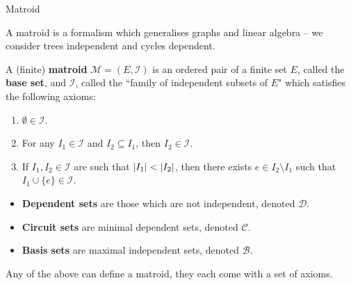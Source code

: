 \documentclass[9pt]{beamer}
\def\calM{\mathcal M}
\def\calC{\mathcal C}
\def\calI{\mathcal I}
\def\calD{\mathcal D}
\def\calB{\mathcal B}
\DeclarePairedDelimiter\abs{\lvert}{\rvert}
\begin{document}
    \begin{frame}{Matroid}

        A matroid is a formalism which generalises graphs and linear algebra -- we consider trees independent and cycles dependent.
        
        \pause

        \vspace{12pt}

        A (finite) \textbf{matroid} $\calM=(E, \calI)$ is an ordered pair of a finite set $E$, called the \textbf{base set}, and $\calI$, called the ``family of independent subsets of $E$" which satisfies the following axioms:
        
        \begin{enumerate}
    
            \item $\emptyset\in\calI$.
            \item  For any $I_1\in\calI$ and $I_2\subseteq I_1$, then $I_2\in\calI$.
            \item If $I_1, I_2\in\calI$ are such that $\abs*{I_1}<\abs*{I_2}$, then there exists $e\in I_2\setminus I_1$ such that $I_1\cup\{e\}\in\calI$.
            
        \end{enumerate}

        \pause

        \vspace{12pt}
    
        \begin{itemize}
            \item \textbf{Dependent sets} are those which are not independent, denoted $\calD$.\pause
            \item \textbf{Circuit sets} are minimal dependent sets, denoted $\calC$.\pause
            \item \textbf{Basis sets} are maximal independent sets, denoted $\calB$.\pause
        \end{itemize}

        \vspace{12pt}

        Any of the above can define a matroid, they each come with a set of axioms.

    \end{frame}
\end{document}
